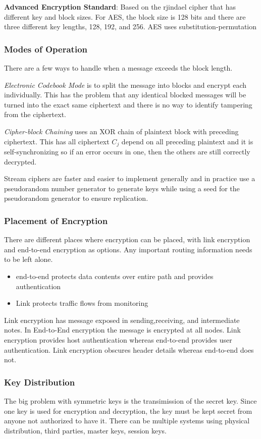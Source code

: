 \documentclass[11pt]{article}
\begin{document}
\textbf{Advanced Encryption Standard}: 
Based on the rjindael cipher that has different key and block sizes. 
For AES, the block size is 128 bits and there are three different key lengths, 128, 192, and 256.
AES uses substitution-permutation

\subsubsection{Modes of Operation}
There are a few ways to handle when a message exceeds the block length.

\textit{Electronic Codebook Mode} is to split the message into blocks and encrypt each individually.
This has the problem that any identical blocked messages will be turned into the exact same ciphertext and there is no way to identify tampering from the ciphertext.

\textit{Cipher-block Chaining} uses an XOR chain of plaintext block with preceding ciphertext.
This has all ciphertext $C_j$ depend on all preceding plaintext and it is self-synchronizing so if an error occurs in one, then the others are still correctly decrypted.

Stream ciphers are faster and easier to implement generally and in practice use a pseudorandom number generator to generate keys while using a seed for the pseudorandom generator to ensure replication.

\subsubsection{Placement of Encryption}
There are different places where encryption can be placed, with link encryption and end-to-end encryption as options.
Any important routing information needs to be left alone.
\begin{itemize}
    \item end-to-end protects data contents over entire path and provides authentication
    \item Link protects traffic flows from monitoring
\end{itemize}

Link encryption has message exposed in sending,receiving, and intermediate notes.
In End-to-End encryption the message is encrypted at all nodes.
Link encryption provides host authentication whereas end-to-end provides user authentication.
Link encryption obscures header details whereas end-to-end does not.

\subsubsection{Key Distribution}
The big problem with symmetric keys is the transimission of the secret key. 
Since one key is used for encryption and decryption, the key must be kept secret from anyone not authorized to have it.
There can be multiple systems using physical distribution, third parties, master keys, session keys.
\end{document}
